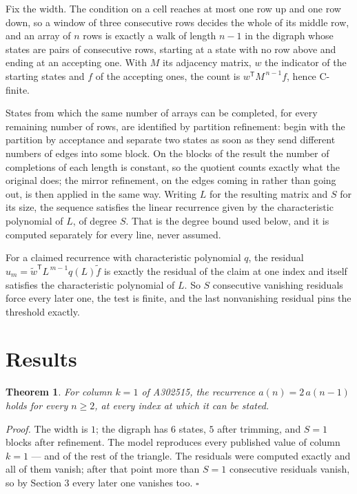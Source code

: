 \documentclass[11pt]{article}
\newtheorem{theorem}{Theorem}
\theoremstyle{definition}
\begin{document}
Fix the width. The condition on a cell reaches at most one row up and one row down, so a window of three consecutive rows decides the whole of its middle row, and an array of $n$ rows is exactly a walk of length $n-1$ in the digraph whose states are pairs of consecutive rows, starting at a state with no row above and ending at an accepting one. With $M$ its adjacency matrix, $w$ the indicator of the starting states and $f$ of the accepting ones, the count is $w^{\mathsf T}M^{\,n-1}f$, hence C-finite.

States from which the same number of arrays can be completed, for every remaining number of rows, are identified by partition refinement: begin with the partition by acceptance and separate two states as soon as they send different numbers of edges into some block. On the blocks of the result the number of completions of each length is constant, so the quotient counts exactly what the original does; the mirror refinement, on the edges coming in rather than going out, is then applied in the same way. Writing $L$ for the resulting matrix and $S$ for its size, the sequence satisfies the linear recurrence given by the characteristic polynomial of $L$, of degree $S$. That is the degree bound used below, and it is computed separately for every line, never assumed.

For a claimed recurrence with characteristic polynomial $q$, the residual $u_m = \tilde w^{\mathsf T}L^{\,m-1}q(L)\tilde f$ is exactly the residual of the claim at one index and itself satisfies the characteristic polynomial of $L$. So $S$ consecutive vanishing residuals force every later one, the test is finite, and the last nonvanishing residual pins the threshold exactly.

\section{Results}

\begin{theorem} For column $k = 1$ of A302515, the recurrence $a(n) = 2\,a(n-1)$ holds for every $n \ge 2$, at every index at which it can be stated.\end{theorem}

{\itshape Proof.} The width is $1$; the digraph has $6$ states, $5$ after trimming, and $S = 1$ blocks after refinement. The model reproduces every published value of column $k = 1$ --- and of the rest of the triangle. The residuals were computed exactly and all of them vanish; after that point more than $S = 1$ consecutive residuals vanish, so by Section 3 every later one vanishes too. $\square$
\end{document}
